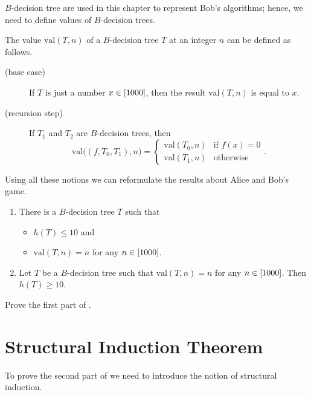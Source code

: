 $B$-decision tree are used in this chapter to represent Bob's algorithms;
hence, we need to define values of $B$-decision trees.
\begin{definition}
  The value $\mathrm{val}(T, n)$ of a $B$-decision tree $T$ at an integer $n$
  can be defined as follows.
  \begin{description}
      \item [(base case)] If $T$ is just a number $x \in {[{1000}]}$,
        then the result $\mathrm{val}(T, n)$ is equal to $x$.
      \item[(recursion step)] If $T_1$ and $T_2$ are $B$-decision trees, then
        \[
          \mathrm{val}\Big((f, T_0, T_1), n\Big) =
          \begin{cases}
            \mathrm{val}(T_0, n) & \text{if } f(x) = 0 \\
            \mathrm{val}(T_1, n) & \text{otherwise}
          \end{cases}.
        \]
  \end{description}
\end{definition}

Using all these notions we can reformulate the results about Alice and Bob's
game.
\begin{theorem}
\label{theorem:guess-the-number}
  \begin{enumerate}
    \item There is a $B$-decision tree $T$ such that
      \begin{itemize}
        \item $h(T) \le 10$ and
        \item $\mathrm{val}(T, n) = n$ for any $n \in {[{1000}]}$.
      \end{itemize}
    \item Let $T$ be a $B$-decision tree such that $\mathrm{val}(T, n) = n$ for
      any $n \in {[{1000}]}$. Then $h(T) \ge 10$.
  \end{enumerate}
\end{theorem}

\begin{exercise}
  Prove the first part of .
\end{exercise}

\section{Structural Induction Theorem}
To prove the second part of  we need
to introduce the notion of structural induction.

